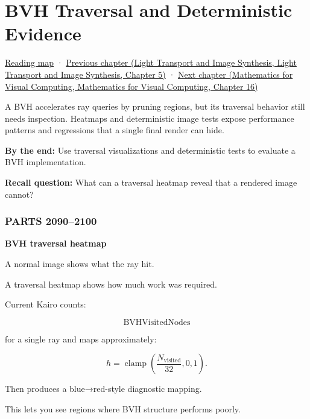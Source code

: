 \hypertarget{03-visual-computing-i-ch011}{}
\chapter{BVH Traversal and Deterministic Evidence}\label{stagechapter:03-visual-computing-i-ch011}\label{03-visual-computing-i-ch011-bvh-traversal-and-deterministic-evidence}

\hyperref[volume-reading-map]{Reading map} · \href{../04-Light-Transport-and-Image-Synthesis/main.pdf\#nameddest=03-visual-computing-i-ch010-a-production-path-tracer-media-randomness-and-validation}{Previous chapter (Light Transport and Image Synthesis, Light Transport and Image Synthesis, Chapter 5)} · \href{../02-Mathematics-for-Visual-Computing/main.pdf\#nameddest=03-visual-computing-i-ch012-probability-statistics-and-uncertainty}{Next chapter (Mathematics for Visual Computing, Mathematics for Visual Computing, Chapter 16)}

A BVH accelerates ray queries by pruning regions, but its traversal behavior still needs inspection. Heatmaps and deterministic image tests expose performance patterns and regressions that a single final render can hide.

\textbf{By the end:} Use traversal visualizations and deterministic tests to evaluate a BVH implementation.

\textbf{Recall question:} What can a traversal heatmap reveal that a rendered image cannot?

\subsection{PARTS 2090--2100}\label{03-visual-computing-i-ch011-parts-20902100}

\textbf{BVH traversal heatmap}

A normal image shows what the ray hit.

A traversal heatmap shows how much work was required.

Current Kairo counts:

\[
\text{BVHVisitedNodes}
\]

for a single ray and maps approximately:

\[
h=
\operatorname{clamp}
\left(
\frac{
N_{\text{visited}}
}{
32
},
0,1
\right).
\]

Then produces a blue→red-style diagnostic mapping.

This lets you see regions where BVH structure performs poorly.

